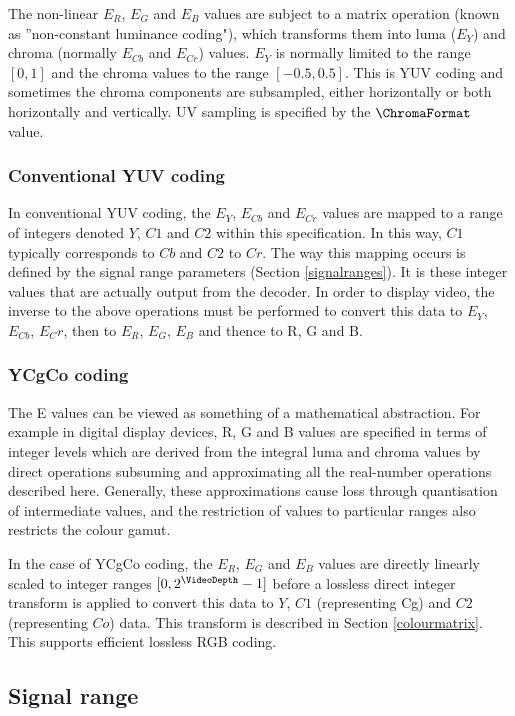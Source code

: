 \begin{informative*}
The non-linear $E_R$, $E_G$ and $E_B$ values are subject to a matrix operation
(known as ''non-constant luminance coding"), which transforms
them into luma ($E_Y$) and chroma (normally $E_{Cb}$ and $E_{Cr}$) values. 
$E_Y$ is normally limited to the 
range $[0,1]$ and the chroma
values to the range $[-0.5, 0.5]$. This is YUV coding and
sometimes the chroma components are subsampled, either horizontally or
both horizontally and vertically. UV sampling is specified by the
$\ChromaFormat$ value. 

\subsubsection{Conventional YUV coding}
In conventional YUV coding, the $E_Y$, $E_{Cb}$ and $E_{Cr}$ values are
mapped to a range of integers denoted $Y$, $C1$ and $C2$ within this
specification. In this way, $C1$ typically corresponds to $Cb$ and
$C2$ to $Cr$. The way this mapping occurs is defined by the signal
range parameters (Section \ref{signalranges}). It is these integer values 
that are actually output from the decoder. In order to display video, the inverse to the above
operations must be performed to convert this data to $E_Y$, $E_{Cb}$, $E_Cr$, then
to $E_R$, $E_G$, $E_B$ and thence to R, G and B.  

\subsubsection{YCgCo coding}
The E values can be viewed as something of a mathematical abstraction.
For example in digital display devices, R, G and B values are specified
in terms of integer levels which are derived from the integral luma and
chroma values by direct operations subsuming and approximating all the
real-number operations described here. Generally, these approximations
cause loss through quantisation of intermediate values, and the
restriction of values to particular ranges also restricts the colour
gamut. 

In the case of YCgCo coding, the $E_R$, $E_G$ and $E_B$ values are directly
linearly scaled to integer ranges $[0,2^\VideoDepth-1]$ before a lossless 
direct integer transform is applied to convert this data to $Y$, $C1$ (representing
Cg) and $C2$ (representing $Co$) data. This transform is described in Section
\ref{colourmatrix}. This supports efficient lossless RGB coding.

\subsection{Signal range}

\end{informative*}
